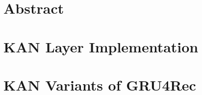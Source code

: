 \chapter*{Abstract}



\tableofcontents
\listoffigures
\listoftables










\appendix

\chapter{KAN Layer Implementation}
\label{app:kan}



\chapter{KAN Variants of GRU4Rec}
\label{app:session}








